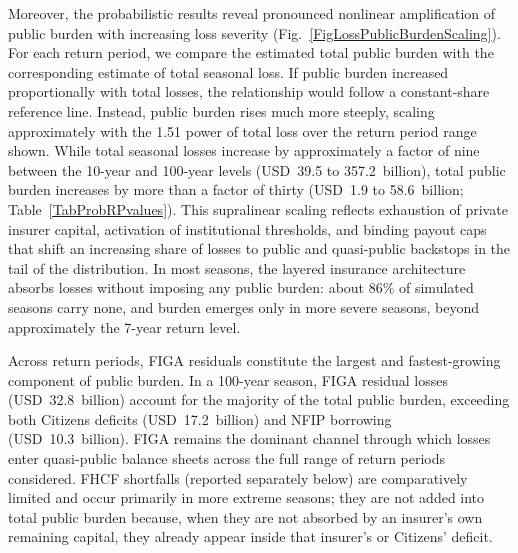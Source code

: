 \documentclass[fleqn,10pt]{wlscirep}
\newcommand{\SIMethodsI}{Supplementary Methods}
\begin{document}
Moreover, the probabilistic results reveal pronounced nonlinear amplification of public burden with increasing loss severity (Fig.~\ref{FigLossPublicBurdenScaling}). For each return period, we compare the estimated total public burden with the corresponding estimate of total seasonal loss. If public burden increased proportionally with total losses, the relationship would follow a constant-share reference line. Instead, public burden rises much more steeply, scaling approximately with the 1.51 power of total loss over the return period range shown. While total seasonal losses increase by approximately a factor of nine between the 10-year and 100-year levels (USD~39.5 to 357.2~billion), total public burden increases by more than a factor of thirty (USD~1.9 to 58.6~billion; Table~\ref{TabProbRPvalues}). This supralinear scaling reflects exhaustion of private insurer capital, activation of institutional thresholds, and binding payout caps that shift an increasing share of losses to public and quasi-public backstops in the tail of the distribution. In most seasons, the layered insurance architecture absorbs losses without imposing any public burden: about 86\% of simulated seasons carry none, and burden emerges only in more severe seasons, beyond approximately the 7-year return level.

Across return periods, FIGA residuals constitute the largest and fastest-growing component of public burden. In a 100-year season, FIGA residual losses (USD~32.8~billion) account for the majority of the total public burden, exceeding both Citizens deficits (USD~17.2~billion) and NFIP  borrowing (USD~10.3~billion). FIGA remains the dominant channel through which losses enter quasi-public balance sheets across the full range of return periods considered. FHCF shortfalls (reported separately below) are comparatively limited and occur primarily in more extreme seasons; they are not added into total public burden because, when they are not absorbed by an insurer's own remaining capital, they already appear inside that insurer's or Citizens' deficit.\medskip
\end{document}
